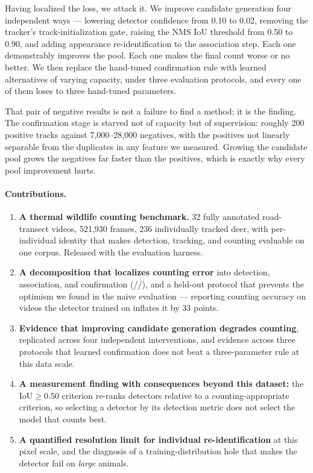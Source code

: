 Having localized the loss, we attack it. We improve candidate generation four independent
ways --- lowering detector confidence from 0.10 to 0.02, removing the tracker's
track-initialization gate, raising the NMS IoU threshold from 0.50 to 0.90, and adding
appearance re-identification to the association step. Each one demonstrably improves the
pool. Each one makes the final count worse or no better. We then replace the hand-tuned
confirmation rule with learned alternatives of varying capacity, under three evaluation
protocols, and every one of them loses to three hand-tuned parameters.

That pair of negative results is not a failure to find a method; it is the finding. The
confirmation stage is starved not of capacity but of supervision: roughly 200 positive
tracks against 7{,}000--28{,}000 negatives, with the positives not linearly separable from
the duplicates in any feature we measured. Growing the candidate pool grows the negatives
far faster than the positives, which is exactly why every pool improvement hurts.

\paragraph{Contributions.}
\begin{enumerate}\itemsep2pt \parskip0pt 
\item \textbf{A thermal wildlife counting benchmark.} 32 fully annotated road-transect
videos, 521,930 frames, 236 individually tracked deer, with per-individual identity that
makes detection, tracking, and counting evaluable on one corpus. Released with the
evaluation harness.
\item \textbf{A decomposition that localizes counting error} into detection, association,
and confirmation (\reachedq/\primaryq/\countedq), and a held-out protocol that prevents the
optimism we found in the naive evaluation --- reporting counting accuracy on videos the
detector trained on inflates it by 33 points.
\item \textbf{Evidence that improving candidate generation degrades counting}, replicated
across four independent interventions, and evidence across three protocols that learned
confirmation does not beat a three-parameter rule at this data scale.
\item \textbf{A measurement finding with consequences beyond this dataset:} the
IoU$\geq$0.50 criterion re-ranks detectors relative to a counting-appropriate criterion, so
selecting a detector by its detection metric does not select the model that counts best.
\item \textbf{A quantified resolution limit for individual re-identification} at this pixel
scale, and the diagnosis of a training-distribution hole that makes the detector fail on
\emph{large} animals.
\end{enumerate}
